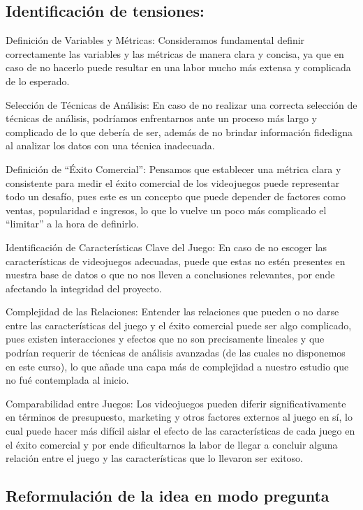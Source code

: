 \documentclass[
  letterpaper,
  DIV=11,
  numbers=noendperiod]{scrreprt}
\begin{document}
\subsection{Identificación de
tensiones:}\label{identificaciuxf3n-de-tensiones}

Definición de Variables y Métricas: Consideramos fundamental definir
correctamente las variables y las métricas de manera clara y concisa, ya
que en caso de no hacerlo puede resultar en una labor mucho más extensa
y complicada de lo esperado.

Selección de Técnicas de Análisis: En caso de no realizar una correcta
selección de técnicas de análisis, podríamos enfrentarnos ante un
proceso más largo y complicado de lo que debería de ser, además de no
brindar información fidedigna al analizar los datos con una técnica
inadecuada.

Definición de ``Éxito Comercial'': Pensamos que establecer una métrica
clara y consistente para medir el éxito comercial de los videojuegos
puede representar todo un desafío, pues este es un concepto que puede
depender de factores como ventas, popularidad e ingresos, lo que lo
vuelve un poco más complicado el ``limitar'' a la hora de definirlo.

Identificación de Características Clave del Juego: En caso de no escoger
las características de videojuegos adecuadas, puede que estas no estén
presentes en nuestra base de datos o que no nos lleven a conclusiones
relevantes, por ende afectando la integridad del proyecto.

Complejidad de las Relaciones: Entender las relaciones que pueden o no
darse entre las características del juego y el éxito comercial puede ser
algo complicado, pues existen interacciones y efectos que no son
precisamente lineales y que podrían requerir de técnicas de análisis
avanzadas (de las cuales no disponemos en este curso), lo que añade una
capa más de complejidad a nuestro estudio que no fué contemplada al
inicio.

Comparabilidad entre Juegos: Los videojuegos pueden diferir
significativamente en términos de presupuesto, marketing y otros
factores externos al juego en sí, lo cual puede hacer más difícil aislar
el efecto de las características de cada juego en el éxito comercial y
por ende dificultarnos la labor de llegar a concluir alguna relación
entre el juego y las características que lo llevaron ser exitoso.

\subsection{Reformulación de la idea en modo
pregunta}\label{reformulaciuxf3n-de-la-idea-en-modo-pregunta}
\end{document}
